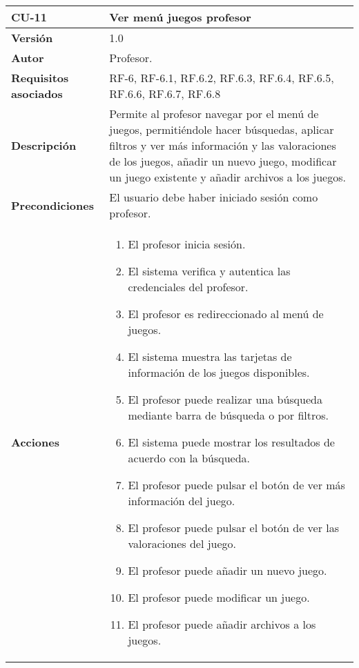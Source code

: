 \begin{table}[h!]
	\centering
	\begin{tabularx}{\linewidth}{ p{} p{} }
		\toprule
		\textbf{CU-11}    & \textbf{Ver menú juegos profesor}\\
		\toprule
		\textbf{Versión}              & 1.0    \\
		\textbf{Autor}                & Profesor. \\
		\textbf{Requisitos asociados} & RF-6, RF-6.1, RF.6.2, RF.6.3, RF.6.4, RF.6.5, RF.6.6, RF.6.7, RF.6.8 \\
		\textbf{Descripción}          & Permite al profesor navegar por el menú de juegos, permitiéndole hacer búsquedas, aplicar filtros y ver más información y las valoraciones de los juegos, añadir un nuevo juego, modificar un juego existente y añadir archivos a los juegos.\\
		\textbf{Precondiciones}         & El usuario debe haber iniciado sesión como profesor. \\
		\textbf{Acciones}             &
		\begin{enumerate}
			\def\labelenumi{\arabic{enumi}.}
			\tightlist
			\item El profesor inicia sesión.
            \item El sistema verifica y autentica las credenciales del profesor.
            \item El profesor es redireccionado al menú de juegos.
            \item El sistema muestra las tarjetas de información de los juegos disponibles.
            \item El profesor puede realizar una búsqueda mediante barra de búsqueda o por filtros.
            \item El sistema puede mostrar los resultados de acuerdo con la búsqueda.
            \item El profesor puede pulsar el botón de ver más información del juego.
            \item El profesor puede pulsar el botón de ver las valoraciones del juego.
            \item El profesor puede añadir un nuevo juego.
            \item El profesor puede modificar un juego.
            \item El profesor puede añadir archivos a los juegos.
		\end{enumerate}\\

\end{tabularx}
\end{table}
